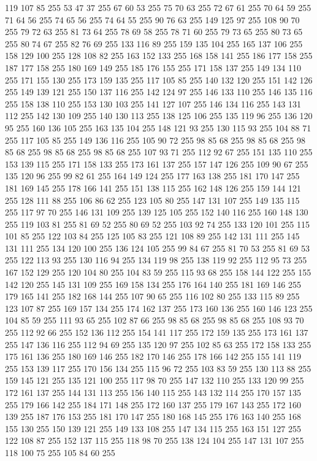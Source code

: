 119 107 85 255 53 47 37 255 67 60 53 255 75 70 63 255 72 67 61 255 70 64 59 255 71 64 56 255 74 65 56 255 74 64 55 255 90 76 63 255 149 125 97 255 108 90 70 255 79 72 63 255 81 73 64 255 78 69 58 255 78 71 60 255 79 73 65 255 80 73 65 255 80 74 67 255 82 76 69 255 133 116 89 255 159 135 104 255 165 137 106 255 158 129 100 255 128 108 82 255 163 152 133 255 168 158 141 255 186 177 158 255 187 177 158 255 180 169 149 255 185 176 155 255 171 158 137 255 149 134 110 255 171 155 130 255 173 159 135 255 117 105 85 255 140 132 120 255 151 142 126 255 149 139 121 255 150 137 116 255 142 124 97 255 146 133 110 255 146 135 116 255 158 138 110 255 153 130 103 255 141 127 107 255 146 134 116 255 143 131 112 255 142 130 109 255 140 130 113 255 138 125 106 255 135 119 96 255 136 120 95 255 160 136 105 255 163 135 104 255 148 121 93 255 130 115 93 255 104 88 71 255 117 105 85 255 149 136 116 255 105 90 72 255 98 85 68 255 98 85 68 255 98 85 68 255
98 85 68 255 98 85 68 255 107 93 71 255 112 92 67 255 151 135 110 255 153 139 115 255 171 158 133 255 173 161 137 255 157 147 126 255 109 90 67 255 135 120 96 255 99 82 61 255 164 149 124 255 177 163 138 255 181 170 147 255 181 169 145 255 178 166 141 255 151 138 115 255 162 148 126 255 159 144 121 255 128 111 88 255 106 86 62 255 123 105 80 255 147 131 107 255 149 135 115 255 117 97 70 255 146 131 109 255 139 125 105 255 152 140 116 255 160 148 130 255 119 103 81 255 81 69 52 255 80 69 52 255 103 92 74 255 133 120 101 255 115 101 85 255 122 103 84 255 125 105 83 255 121 108 89 255 142 131 111 255 145 131 111 255 134 120 100 255 136 124 105 255 99 84 67 255 81 70 53 255 81 69 53 255 122 113 93 255 130 116 94 255 134 119 98 255 138 119 92 255 112 95 73 255 167 152 129 255 120 104 80 255 104 83 59 255 115 93 68 255 158 144 122 255 155 142 120 255 145 131 109 255 169 158 134 255 176 164 140 255 181 169 146 255 179 165 141 255 182 168 144 255 107 90 65 255
116 102 80 255 133 115 89 255 123 107 87 255 169 157 134 255 174 162 137 255 173 160 136 255 160 146 123 255 104 85 59 255 111 93 65 255 102 87 66 255 98 85 68 255 98 85 68 255 108 93 70 255 112 92 66 255 152 136 112 255 154 141 117 255 172 159 135 255 173 161 137 255 147 136 116 255 112 94 69 255 135 120 97 255 102 85 63 255 172 158 133 255 175 161 136 255 180 169 146 255 182 170 146 255 178 166 142 255 155 141 119 255 153 139 117 255 170 156 134 255 115 96 72 255 103 83 59 255 130 113 88 255 159 145 121 255 135 121 100 255 117 98 70 255 147 132 110 255 133 120 99 255 172 161 137 255 144 131 113 255 156 140 115 255 143 132 114 255 170 157 135 255 179 166 142 255 184 171 148 255 172 160 137 255 179 167 143 255 172 160 139 255 187 176 153 255 181 170 147 255 180 168 145 255 176 163 140 255 168 155 130 255 150 139 121 255 149 133 108 255 147 134 115 255 163 151 127 255 122 108 87 255 152 137 115 255 118 98 70 255 138 124 104 255 147 131 107 255 118 100 75 255 105 84 60 255
